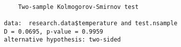\begin{verbatim} 

	Two-sample Kolmogorov-Smirnov test

data:  research.data$temperature and test.nsample
D = 0.0695, p-value = 0.9959
alternative hypothesis: two-sided

\end{verbatim}